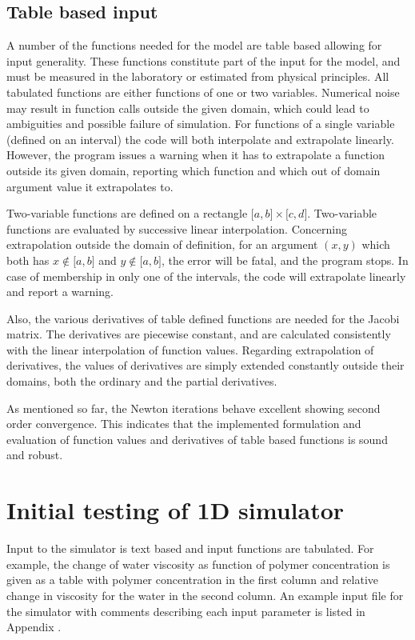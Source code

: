 \subsection{Table based input}
A number of the functions needed for the model are table based allowing for input generality. These functions constitute part of the input for the model, and must be measured in the laboratory or estimated from physical principles. All tabulated functions are either functions of one or two variables. Numerical noise may result in function calls outside the given domain, which could lead to ambiguities and possible failure of simulation. For functions of a single variable (defined on an interval) the code will both interpolate and extrapolate linearly. However, the program issues a warning when it has to extrapolate a function outside its given domain, reporting which function and which out of domain argument value it extrapolates to.

Two-variable functions are defined on a rectangle $\big[a,b\big]\times\big[c,d\big]$. Two-variable functions are evaluated by successive linear interpolation. Concerning extrapolation outside the domain of definition, for an argument $(x,y)$ which both has $x\notin\big[a,b\big]$ and $y\notin\big[a,b\big]$, the error will be fatal, and the program stops. In case of membership in only one of the intervals, the code will extrapolate linearly and report a warning.

Also, the various derivatives of table defined functions are needed for the Jacobi matrix. The derivatives are piecewise constant, and are calculated consistently with the linear interpolation of function values. Regarding extrapolation of derivatives, the values of derivatives are simply extended constantly outside their domains, both the ordinary and the partial derivatives.

As mentioned so far, the Newton iterations behave excellent showing second order convergence. This indicates that the implemented formulation and evaluation of function values and derivatives of table based functions is sound and robust.   


\section{Initial testing of 1D simulator}

Input to the simulator is text based and input functions are tabulated. For example, the change of water viscosity as function of polymer concentration is given as a table with polymer concentration in the first column and relative change in viscosity for the water in the second column. An example input file for the simulator with comments describing each input parameter is listed in Appendix \what. 

